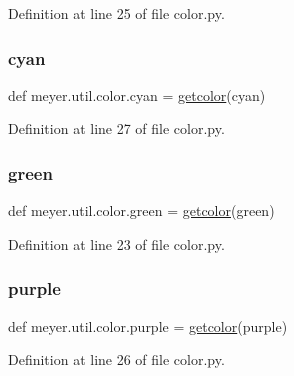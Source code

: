 Definition at line 25 of file color.\+py.

\mbox{\label{namespacemeyer_1_1util_1_1color_a6da67b9f01da86ac24097fa7e978526e}} 
\subsubsection{\texorpdfstring{cyan}{cyan}}
{\footnotesize\ttfamily def meyer.\+util.\+color.\+cyan = \hyperlink{namespacemeyer_1_1util_1_1color_a777b068ba3d7bb397cb83871d691ecf5}{getcolor}(\textquotesingle{}cyan\textquotesingle{})}



Definition at line 27 of file color.\+py.

\mbox{\label{namespacemeyer_1_1util_1_1color_a408ce5a7a281f56a95ee22c3b30917ce}} 
\subsubsection{\texorpdfstring{green}{green}}
{\footnotesize\ttfamily def meyer.\+util.\+color.\+green = \hyperlink{namespacemeyer_1_1util_1_1color_a777b068ba3d7bb397cb83871d691ecf5}{getcolor}(\textquotesingle{}green\textquotesingle{})}



Definition at line 23 of file color.\+py.

\mbox{\label{namespacemeyer_1_1util_1_1color_acb70a71abf2319da1f0086bc3c7c4315}} 
\subsubsection{\texorpdfstring{purple}{purple}}
{\footnotesize\ttfamily def meyer.\+util.\+color.\+purple = \hyperlink{namespacemeyer_1_1util_1_1color_a777b068ba3d7bb397cb83871d691ecf5}{getcolor}(\textquotesingle{}purple\textquotesingle{})}



Definition at line 26 of file color.\+py.

